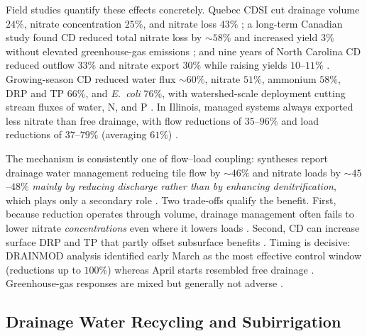 \documentclass[11pt]{article}
\begin{document}
Field studies quantify these effects concretely. Quebec CDSI cut drainage
volume $24\%$, nitrate concentration $25\%$, and nitrate loss $43\%$
\parencite{Ng2000}; a long-term Canadian study found CD reduced total nitrate
loss by $\sim58\%$ and increased yield $3\%$ without elevated greenhouse-gas
emissions \parencite{Madramootoo2024}; and nine years of North Carolina CD
reduced outflow $33\%$ and nitrate export $30\%$ while raising yields
$10$--$11\%$ \parencite{Poole2018}. Growing-season CD reduced water flux
$\sim60\%$, nitrate $51\%$, ammonium $58\%$, DRP and TP $66\%$, and
\emph{E.\ coli} $76\%$, with watershed-scale deployment cutting stream fluxes
of water, N, and P \parencite{Sunohara2016,Sunohara2015}. In Illinois, managed
systems always exported less nitrate than free drainage, with flow reductions
of $35$--$96\%$ and load reductions of $37$--$79\%$ (averaging $61\%$)
\parencite{Cooke2012}.

The mechanism is consistently one of flow--load coupling: syntheses report
drainage water management reducing tile flow by $\sim46\%$ and nitrate loads by
$\sim45$--$48\%$ \emph{mainly by reducing discharge rather than by enhancing
denitrification}, which plays only a secondary role
\parencite{Ross2016,Ward2018}. Two trade-offs qualify the benefit. First,
because reduction operates through volume, drainage management often fails to
lower nitrate \emph{concentrations} even where it lowers loads
\parencite{Grenon2023,Wesström2014}. Second, CD can increase surface DRP and TP
that partly offset subsurface benefits \parencite{King2022,Wu2025}. Timing is
decisive: DRAINMOD analysis identified early March as the most effective
control window (reductions up to $100\%$) whereas April starts resembled free
drainage \parencite{Kesicka2023c}. Greenhouse-gas responses are mixed but
generally not adverse \parencite{Madramootoo2024,Smith2019}.

\subsection{Drainage Water Recycling and Subirrigation}
\end{document}
